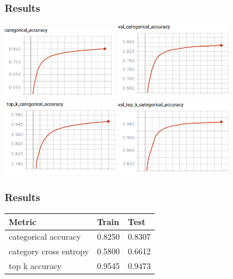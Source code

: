 \documentclass[14pt]{beamer}
\begin{document}
		\begin{frame}
		\frametitle{Results}
			\hfil\hfil\includegraphics[width=5cm]{part4/final_CNN_train_category_accuracy}
			\hfil\hfil\includegraphics[width=5cm]{part4/final_CNN_val_category_accuracy}\newline
			\vfil
			\hfil\hfil\includegraphics[width=5cm]{part4/final_CNN_train_top_k_accuracy}
			\hfil\hfil\includegraphics[width=5cm]{part4/final_CNN_val_top_k_accuracy}\newline
		\end{frame}
		
		
		\begin{frame}
			\frametitle{Results}
			\begin{table}[h]
				\centering
				\begin{tabular}{| p{4cm} | p{3cm} | p{3cm} |}
					\hline
					\textbf{Metric}  & \textbf{Train} & \textbf{Test}                                                    
					\\ \hline
					categorical accuracy   &  0.8250 & 0.8307
					\\ \hline
					category cross entropy  &   0.5800 & 0.6612
					\\ \hline
					top k accuracy   &  0.9545 & 0.9473
					\\ \hline		
				\end{tabular}
			\end{table}
		\end{frame}
		
\end{document}
